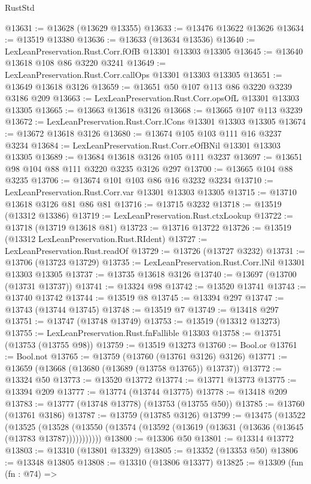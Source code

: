 \begin{lexlean}{RustStd}
\begin{coremodule}
@13631 := @13628 (@13629 @13355)
@13633 := @13476 @13622 @13626
@13634 := @13519 @13380
@13636 := @13633 (@13634 @13536)
@13640 := LexLeanPreservation.Rust.Corr.fOfB @13301 @13303 @13305
@13645 := @13640 @13618 @108 @86 @3220 @3241
@13649 := LexLeanPreservation.Rust.Corr.callOps @13301 @13303 @13305
@13651 := @13649 @13618 @3126
@13659 := @13651 @50 @107 @113 @86 @3220 @3239 @3186 @209
@13663 := LexLeanPreservation.Rust.Corr.opsOfL @13301 @13303 @13305
@13665 := @13663 @13618 @3126
@13668 := @13665 @107 @113 @3239
@13672 := LexLeanPreservation.Rust.Corr.lCons @13301 @13303 @13305
@13674 := @13672 @13618 @3126
@13680 := @13674 @105 @103 @111 @16 @3237 @3234
@13684 := LexLeanPreservation.Rust.Corr.eOfBNil @13301 @13303 @13305
@13689 := @13684 @13618 @3126 @105 @111 @3237
@13697 := @13651 @98 @104 @88 @111 @3220 @3235 @3126 @297
@13700 := @13665 @104 @88 @3235
@13706 := @13674 @101 @103 @86 @16 @3232 @3234
@13710 := LexLeanPreservation.Rust.Corr.var @13301 @13303 @13305
@13715 := @13710 @13618 @3126 @81 @86 @81
@13716 := @13715 @3232
@13718 := @13519 (@13312 @13386)
@13719 := LexLeanPreservation.Rust.ctxLookup
@13722 := @13718 (@13719 @13618 @81)
@13723 := @13716 @13722
@13726 := @13519 (@13312 LexLeanPreservation.Rust.RIdent)
@13727 := LexLeanPreservation.Rust.readOf
@13729 := @13726 (@13727 @3232)
@13731 := @13706 (@13723 @13729)
@13735 := LexLeanPreservation.Rust.Corr.lNil @13301 @13303 @13305
@13737 := @13735 @13618 @3126
@13740 := @13697 (@13700 (@13731 @13737))
@13741 := @13324 @98
@13742 := @13520 @13741
@13743 := @13740 @13742
@13744 := @13519 @8
@13745 := @13394 @297
@13747 := @13743 (@13744 @13745)
@13748 := @13519 @7
@13749 := @13418 @297
@13751 := @13747 (@13748 @13749)
@13753 := @13519 (@13312 @13273)
@13755 := LexLeanPreservation.Rust.fnFallible @13303
@13758 := @13751 (@13753 (@13755 @98))
@13759 := @13519 @13273
@13760 := Bool.or
@13761 := Bool.not
@13765 := @13759 (@13760 (@13761 @3126) @3126)
@13771 := @13659 (@13668 (@13680 (@13689 (@13758 @13765)) @13737))
@13772 := @13324 @50
@13773 := @13520 @13772
@13774 := @13771 @13773
@13775 := @13394 @209
@13777 := @13774 (@13744 @13775)
@13778 := @13418 @209
@13783 := @13777 (@13748 @13778) (@13753 (@13755 @50))
@13785 := @13760 (@13761 @3186)
@13787 := @13759 (@13785 @3126)
@13799 := @13475
    (@13522
      (@13525
        (@13528 (@13550 (@13574 (@13592 (@13619 (@13631 (@13636 (@13645 (@13783 @13787)))))))))))
@13800 := @13306 @50
@13801 := @13314 @13772
@13803 := @13310 (@13801 @13329)
@13805 := @13352 (@13353 @50)
@13806 := @13348 @13805
@13808 := @13310 (@13806 @13377)
@13825 := @13309
    (fun (fn : @74) =>

\end{coremodule}
\end{lexlean}
